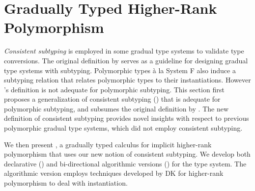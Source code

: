 \chapter{Gradually Typed Higher-Rank Polymorphism}
\label{chap:Gradual}

\textit{Consistent subtyping} is employed in some gradual type systems to validate type
conversions. The original definition by \citet{siek2007gradual} serves as
a guideline for designing gradual type systems with subtyping. Polymorphic
types \`a la System F also induce a subtyping relation that relates
polymorphic types to their instantiations. However
\citeauthor{siek2007gradual}'s definition is not adequate for polymorphic
subtyping.
This section first proposes a generalization of consistent subtyping
() that is adequate for polymorphic subtyping, and
subsumes the original definition by \citeauthor{siek2007gradual}. The new
definition of consistent subtyping provides novel insights with respect to
previous polymorphic gradual type systems, which did not employ consistent
subtyping.

We then present \gpc, a gradually typed calculus for implicit
higher-rank polymorphism that uses our new notion of consistent subtyping. We
develop both declarative () and bi-directional
algorithmic versions () for the type system. The
algorithmic version employs techniques developed by DK \citep{DK} for
higher-rank polymorphism to deal with instantiation.








